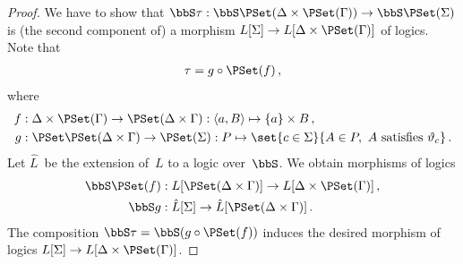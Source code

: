 \documentclass[10pt, fleqn]{scrartcl}
\newcommand*{\?}{\kern .08em}
\begin{document}
\begin{proof}
We have to show that $\bbS\tau : \bbS\PSet(\Delta \times \PSet(\Gamma)) \to \bbS\PSet(\Sigma)$
is (the second component of) a morphism $L[\Sigma] \to L[\Delta \times \PSet(\Gamma)]$ of logics.
Note that
\begin{align*}
  \tau = g \circ \PSet(f)\,,
\end{align*}
where
\begin{align*}
  f &: \Delta \times \PSet(\Gamma) \to \PSet(\Delta \times \Gamma)
    : \langle a,B\rangle \mapsto \{a\} \times B\,, \\
  g &: \PSet\PSet(\Delta \times \Gamma) \to \PSet(\Sigma)
    : P \mapsto \set{ c \in \Sigma }{ A \in P,\ A \text{ satisfies } \vartheta_c }\,.
\end{align*}
Let $\hat L$~be the extension of~$L$ to a logic over~$\bbS$.
We obtain morphisms of logics
\begin{align*}
  \bbS\PSet(f) &: L[\PSet(\Delta \times \Gamma)] \to L[\Delta \times \PSet(\Gamma)]\,, \\
  \bbS g &: \hat L[\Sigma] \to \hat L[\PSet(\Delta \times \Gamma)]\,.
\end{align*}
The composition $\bbS\tau = \bbS(g \circ \PSet(f))$ induces the desired morphism of logics
$L[\Sigma] \to L[\Delta \times \PSet(\Gamma)]$.
\end{proof}
\end{document}
